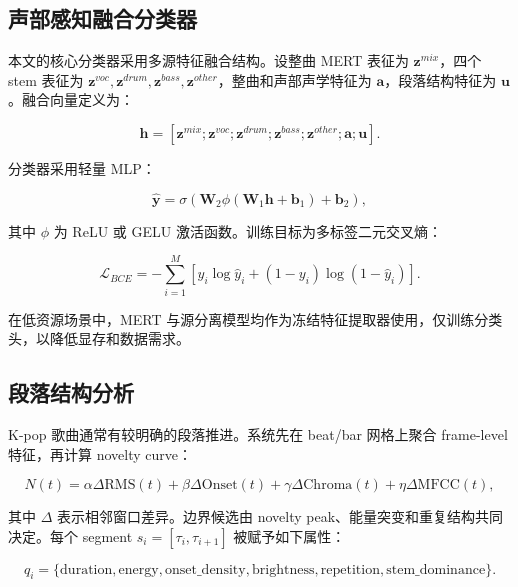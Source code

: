 \documentclass[UTF8,zihao=-4]{ctexart}
\begin{document}
\subsection{声部感知融合分类器}

本文的核心分类器采用多源特征融合结构。设整曲 MERT 表征为 $\bm{z}^{mix}$，四个 stem 表征为 $\bm{z}^{voc},\bm{z}^{drum},\bm{z}^{bass},\bm{z}^{other}$，整曲和声部声学特征为 $\bm{a}$，段落结构特征为 $\bm{u}$。融合向量定义为：

\begin{equation}
\bm{h}=\left[\bm{z}^{mix}; \bm{z}^{voc}; \bm{z}^{drum}; \bm{z}^{bass}; \bm{z}^{other}; \bm{a}; \bm{u}\right].
\end{equation}

分类器采用轻量 MLP：

\begin{equation}
\hat{\bm{y}}=\sigma\left(\bm{W}_2\phi(\bm{W}_1\bm{h}+\bm{b}_1)+\bm{b}_2\right),
\end{equation}

其中 $\phi$ 为 ReLU 或 GELU 激活函数。训练目标为多标签二元交叉熵：

\begin{equation}
\mathcal{L}_{BCE}=-\sum_{i=1}^{M}\left[y_i\log \hat{y}_i+(1-y_i)\log(1-\hat{y}_i)\right].
\end{equation}

在低资源场景中，MERT 与源分离模型均作为冻结特征提取器使用，仅训练分类头，以降低显存和数据需求。

\subsection{段落结构分析}

K-pop 歌曲通常有较明确的段落推进。系统先在 beat/bar 网格上聚合 frame-level 特征，再计算 novelty curve：

\begin{equation}
N(t)=\alpha \Delta \mathrm{RMS}(t)+\beta \Delta \mathrm{Onset}(t)+\gamma \Delta \mathrm{Chroma}(t)+\eta \Delta \mathrm{MFCC}(t),
\end{equation}

其中 $\Delta$ 表示相邻窗口差异。边界候选由 novelty peak、能量突变和重复结构共同决定。每个 segment $s_i=[\tau_i,\tau_{i+1}]$ 被赋予如下属性：

\begin{equation}
q_i=\{\mathrm{duration}, \mathrm{energy}, \mathrm{onset\_density}, \mathrm{brightness}, \mathrm{repetition}, \mathrm{stem\_dominance}\}.
\end{equation}
\end{document}
